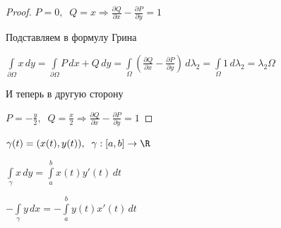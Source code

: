 \begin{proof}\thmslashn

	$P = 0,\;\; Q = x \Rightarrow   \frac{\partial Q}{\partial x} - \frac{\partial P}{\partial y} = 1$
	
	Подставляем в формулу Грина
	
	$\int\limits_{\partial \Omega} x \,dy = \int\limits_{\partial \Omega} P \,dx + Q\,dy = \int\limits_{\Omega} \left(  \frac{\partial Q}{\partial x}-\frac{\partial P}{\partial y} \right) \, d\lambda_2 =  \int\limits_{\Omega} 1 \,d\lambda_2 = \lambda_2 \Omega$
	
	И теперь в другую сторону
	
	$P = -\frac{y}{2},\;\; Q = \frac{x}{2} \Rightarrow   \frac{\partial Q}{\partial x} - \frac{\partial P}{\partial y} = 1$

\end{proof}

\begin{remark}\thmslashn
	
	$\gamma(t) = (x(t), y(t)),\;\; \gamma : [a, b] \to \R$
	
	$\int\limits_{\gamma} x \,dy = \int\limits_a^b x(t)y'(t)\,dt$
	
	$-\int\limits_{\gamma} y \,dx = -\int\limits_a^b y(t)x'(t)\,dt$
	
\end{remark}